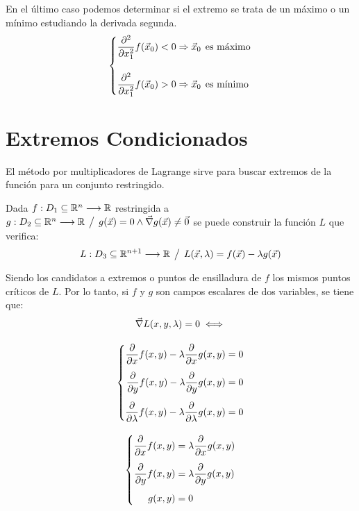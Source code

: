 \documentclass[a5paper,12pt,twoside]{book}
\begin{document}
En el último caso podemos determinar si el extremo se trata de un máximo o un mínimo estudiando la derivada segunda.
\begin{equation*}
    \left\{
    \begin{aligned}
        \frac{\partial^2}{\partial x_1^2} f(\Vec{x}_0) < 0 &\Rightarrow \Vec{x}_0 \hspace{1ex} \textrm{es máximo}
        \\[1em]
        \frac{\partial^2}{\partial x_1^2} f(\Vec{x}_0) > 0 &\Rightarrow \Vec{x}_0 \hspace{1ex} \textrm{es mínimo}
    \end{aligned}
    \right.
\end{equation*}


\section{Extremos Condicionados}

El método por multiplicadores de Lagrange sirve para buscar extremos de la función para un conjunto restringido.

Dada $f:D_1 \subseteq \mathbb{R}^n \longrightarrow \mathbb{R}$ restringida a $g:D_2 \subseteq \mathbb{R}^n \longrightarrow \mathbb{R} \hspace{1ex} \big/ \hspace{1ex} g(\Vec{x})=0 \land \Vec{\nabla} g(\Vec{x}) \neq \Vec{0}$ se puede construir la función $L$ que verifica:
\begin{equation*}
    L:D_3 \subseteq \mathbb{R}^{n+1} \longrightarrow \mathbb{R} \hspace{1ex} \big/ \hspace{1ex} L(\Vec{x}, \lambda) = f(\Vec{x}) - \lambda g(\Vec{x})
\end{equation*}

Siendo los candidatos a extremos o puntos de ensilladura de $f$ los mismos puntos críticos de $L$.
Por lo tanto, si $f$ y $g$ son campos escalares de dos variables, se tiene que:
\begin{gather*}
    \Vec{\nabla} L(x,y,\lambda)=0 \iff
    \\[1em]
    \left\{
    \begin{aligned}
        \frac{\partial}{\partial x} f(x,y) - \lambda \frac{\partial}{\partial x} g(x,y) &= 0
        \\[1ex]
        \frac{\partial}{\partial y} f(x,y) - \lambda \frac{\partial}{\partial y} g(x,y) &= 0
        \\[1ex]
        \frac{\partial}{\partial \lambda} f(x,y) - \lambda \frac{\partial}{\partial \lambda} g(x,y) &= 0
    \end{aligned}
    \right.
    \\[1em]
    \left\{
    \begin{aligned}
        \frac{\partial}{\partial x} f(x,y) &= \lambda \frac{\partial}{\partial x} g(x,y)
        \\[1ex]
        \frac{\partial}{\partial y} f(x,y) &= \lambda \frac{\partial}{\partial y} g(x,y)
        \\[1ex]
        g(x,y) &= 0
    \end{aligned}
    \right.
\end{gather*}
\end{document}
